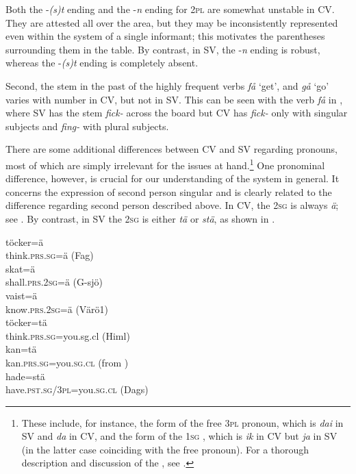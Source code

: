 \documentclass[output=paper,colorlinks,citecolor=brown,draft,draftmode]{langscibook}
\begin{document}
Both the -\textit{(s)t} ending and the -\textit{n} ending for 2\textsc{pl} are somewhat unstable in CV. They are attested all over the area, but they may be inconsistently represented even within the system of a single informant; this motivates the parentheses surrounding them in the table. By contrast, in SV, the -\textit{n} ending is robust, whereas the -\textit{(s)t} ending is completely absent.



Second, the stem in the past  of the highly frequent verbs \textit{få} ‘get’, and \textit{gå} ‘go’ varies with number in CV, but not in SV. This can be seen with the verb \textit{få} in , where SV has the stem \textit{fick-} across the board but CV has \textit{fick-} only with singular subjects and \textit{fing-} with plural subjects.



There are some additional differences between CV and SV regarding pronouns, most of which are simply irrelevant for the issues at hand.\footnote{These include, for instance, the form of the free 3\textsc{pl} pronoun, which is \textit{dai} in SV and \textit{da} in CV, and the form of the 1\textsc{sg} , which is \textit{ik} in CV but \textit{ja} in SV (in the latter case coinciding with the free pronoun). For a thorough description and discussion of the  , see \citet{Petzell2017}.} One pronominal difference, however, is crucial for our understanding of the  system in general. It concerns the expression of second person singular and is clearly related to the difference regarding second person  described above. In CV, the 2\textsc{sg}  is always \textit{ä}; see . By contrast, in SV the 2\textsc{sg}  is either \textit{tä} or \textit{stä}, as shown in .


\ea\label{ex:petzell:19}
\ea\label{ex:petzell:19a}
\gll töcker=ä \\
    think.\textsc{prs.sg=}ä (Fag)    \\
\ex\label{ex:petzell:19b}
\gll skat=ä   \\
    shall.\textsc{prs}.2\textsc{sg}=ä (G-sjö)  \\
\ex\label{ex:petzell:19c}
\gll vaist=ä   \\
    know.\textsc{prs}.2\textsc{sg}=ä (Värö1)\\
\z
\ex\label{ex:petzell:20}
\ea\label{ex:petzell:20a}
\gll töcker=tä \\
    think.\textsc{prs.sg}=you.sg.cl (Himl)  \\
\ex\label{ex:petzell:20b}
\gll kan=tä   \\
    kan.\textsc{prs.sg}=you.\textsc{sg}.\textsc{cl} (from \citealt{Andersson1922})  \\
\ex\label{ex:petzell:20c}
\gll hade=stä   \\
    have.\textsc{pst}.\textsc{sg}/3\textsc{pl}=you.\textsc{sg}.\textsc{cl} (Dags)\\
\z
\z
\end{document}
